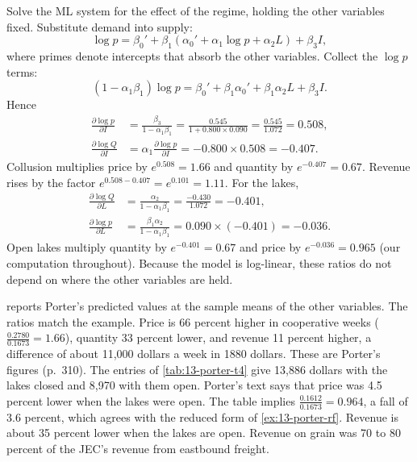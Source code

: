 \begin{example}\label{ex:13-porter-rf}
Solve the ML system for the effect of the regime, holding the other variables fixed. Substitute demand into supply:
\begin{equation*}
  \log p = \beta_0' + \beta_1\left(\alpha_0' + \alpha_1\log p + \alpha_2 L\right) + \beta_3 I,
\end{equation*}
where primes denote intercepts that absorb the other variables. Collect the $\log p$ terms:
\begin{equation*}
  (1 - \alpha_1\beta_1)\log p = \beta_0' + \beta_1\alpha_0' + \beta_1\alpha_2 L + \beta_3 I .
\end{equation*}
Hence
\begin{align*}
  \frac{\partial \log p}{\partial I} &= \frac{\beta_3}{1 - \alpha_1\beta_1} = \frac{0.545}{1 + 0.800 \times 0.090}
  = \frac{0.545}{1.072} = 0.508, \\
  \frac{\partial\log Q}{\partial I} &= \alpha_1\frac{\partial\log p}{\partial I} = -0.800\times 0.508 = -0.407 .
\end{align*}
Collusion multiplies price by $e^{0.508} = 1.66$ and quantity by $e^{-0.407} = 0.67$. Revenue rises by the factor
$e^{0.508 - 0.407} = e^{0.101} = 1.11$. For the lakes,
\begin{align*}
  \frac{\partial\log Q}{\partial L} &= \frac{\alpha_2}{1 - \alpha_1\beta_1} = \frac{-0.430}{1.072} = -0.401, \\
  \frac{\partial\log p}{\partial L} &= \frac{\beta_1\alpha_2}{1 - \alpha_1\beta_1} = 0.090 \times (-0.401) = -0.036 .
\end{align*}
Open lakes multiply quantity by $e^{-0.401} = 0.67$ and price by $e^{-0.036} = 0.965$ (our computation throughout).
Because the model is log-linear, these ratios do not depend on where the other variables are held.
\end{example}

 reports Porter's predicted values at the sample means of the other variables. The ratios
match the example. Price is 66 percent higher in cooperative weeks ($\frac{0.2780}{0.1673} = 1.66$), quantity 33
percent lower, and revenue 11 percent higher, a difference of about 11,000 dollars a week in 1880 dollars. These
are Porter's figures (p.~310). The entries of \cref{tab:13-porter-t4} give 13,886 dollars with the lakes closed and
8,970 with them open. Porter's
text says that price was 4.5 percent lower when the lakes were open. The table implies
$\frac{0.1612}{0.1673} = 0.964$, a fall of 3.6 percent, which agrees with the reduced form of
\cref{ex:13-porter-rf}.
Revenue is about 35 percent lower when the lakes are open. Revenue on grain was 70 to 80 percent of the JEC's revenue
from eastbound freight.

